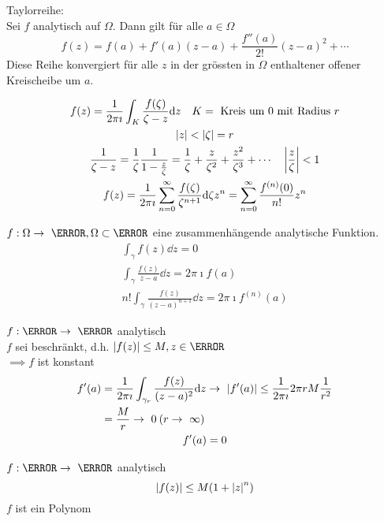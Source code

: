 Taylorreihe: \\
Sei $f$ analytisch auf $\Omega$. Dann gilt für alle $a \in \Omega$
\[ f(z) = f(a) + f'(a)(z-a) + \frac{f''(a)}{2!}(z-a)^2 + \dotsb \]
Diese Reihe konvergiert für alle $z$ in der grössten in $\Omega$ enthaltener offener Kreischeibe um $a$.
\begin{bew}[note = {Bewies für $a = 0$}]
	\begin{gather*}
		f(z) = \frac{1}{2\pi\imath} \int_K \frac{f(\zeta)}{\zeta - z} \dd z \quad K = \text{ Kreis um $0$ mit Radius } r \\
		\abs{z} < \abs{\zeta} = r \\
		\frac{1}{\zeta - z} = \frac{1}{\zeta} \frac{1}{1-\frac{z}{\zeta}} = \frac{1}{\zeta} + \frac{z}{\zeta^2} + \frac{z^2}{\zeta^3} + \dotsb \quad \abs{\frac{z}{\zeta}} < 1 \\
		f(z) = \frac{1}{2\pi\imath} \sum_{n=0}^\infty \frac{f(\zeta)}{\zeta^{n+1}} \dd \zeta z^n = \sum_{n=0}^\infty \frac{f^{(n)}(0)}{n!} z^n
	\end{gather*}
\end{bew}
$f: \Omega \rightarrow \C , \Omega \subset \C$ eine zusammenhängende analytische Funktion.
\begin{gather*}
	\int_\gamma f(z) \dd z = 0 \\
	\int_\gamma \frac{f(z)}{z-a} \dd z = 2\pi\imath f(a) \\
	n! \int_\gamma \frac{f(z)}{(z-a)^{n+1}} \dd z = 2\pi\imath f^{(n)}(a)
\end{gather*}
\begin{satz*}[note = Satz von Liouville , index = Satz von Liouville , indexformat = {3!12~ 1!~23}]
	$f: \C \rightarrow \C$ analytisch \\
	$f$ sei beschränkt, d.h. $\abs{f(z)} \leq M , z \in \C$ \\
	$\implies f$ ist konstant
	\begin{gather*}
		\begin{split}
			f'(a)
				&= \frac{1}{2\pi\imath} \int_{\gamma_r} \frac{f(z)}{(z-a)^2} \dd z \rightarrow \abs{f'(a)} \leq \frac{1}{2\pi\imath} 2\pi r M \frac{1}{r^2} \\
				&= \frac{M}{r} \rightarrow 0 \: ( r \rightarrow \infty )
		\end{split} \\
		f'(a) = 0
	\end{gather*}
\end{satz*}
$f: \C \rightarrow \C$ analytisch
\[ \abs{f(z)} \leq M ( 1 + \abs{z}^n ) \]
$f$ ist ein Polynom

